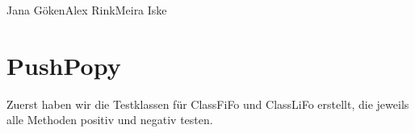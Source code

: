 \documentclass{pi2}
\begin{document}
%


          {Jana Göken}{Alex Rink}{Meira Iske}
\section{PushPopy}
Zuerst haben wir die Testklassen für ClassFiFo und ClassLiFo erstellt, die jeweils alle Methoden positiv und negativ testen.
\end{document}
